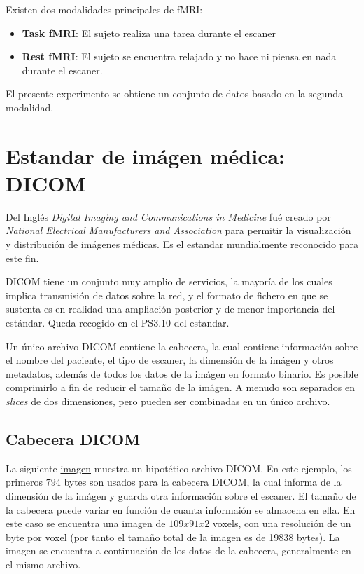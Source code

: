 Existen dos modalidades principales de fMRI:

\begin{itemize}
	\item \textbf{Task fMRI}: El sujeto realiza una tarea durante el escaner
	\item \textbf{Rest fMRI}: El sujeto se encuentra relajado y no hace ni piensa en nada durante el escaner.
\end{itemize}

El presente experimento se obtiene un conjunto de datos basado en la segunda modalidad.

\section{Estandar de imágen médica: DICOM}

Del Inglés \textit{Digital Imaging and Communications in Medicine} fué creado por \textit{National Electrical Manufacturers and Association} para permitir la visualización y distribución de imágenes médicas. Es el estandar mundialmente reconocido para este fin.\cite{dcm2nifti}

DICOM tiene un conjunto muy amplio de servicios, la mayoría de los cuales implica transmisión de datos sobre la red, y el formato de fichero en que se sustenta es en realidad una ampliación posterior y de menor importancia del estándar. Queda recogido en el PS3.10 \cite{dicom} del estandar.\cite{nema}

Un único archivo DICOM contiene la cabecera, la cual contiene información sobre el nombre del paciente, el tipo de escaner, la dimensión de la imágen y otros metadatos, además de todos los datos de la imágen en formato binario. Es posible comprimirlo a fin de reducir el tamaño de la imágen. A menudo son separados en \textit{slices} de dos dimensiones, pero pueden ser combinadas en un único archivo.\cite{dcm2nifti}


\subsection{Cabecera DICOM}

La siguiente \hyperref[dicom:dummy_image]{imagen} muestra un hipotético archivo DICOM. En este ejemplo, los primeros $794$ bytes son usados para la cabecera DICOM, la cual informa de la dimensión de la imágen y guarda otra información sobre el escaner. El tamaño de la cabecera puede variar en función de cuanta informaión se almacena en ella. En este caso se encuentra una imagen de $109x91x2$ voxels, con una resolución de un byte por voxel (por tanto el tamaño total de la imagen es de 19838 bytes). La imagen se encuentra a continuación de los datos de la cabecera, generalmente en el mismo archivo.

